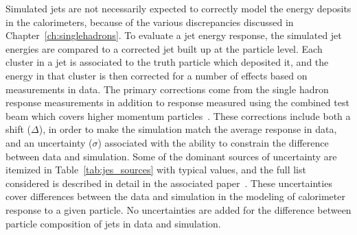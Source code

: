 Simulated jets are not necessarily expected to correctly model the energy deposits in the calorimeters, because of the various discrepancies discussed in Chapter~\ref{ch:singlehadrons}.
To evaluate a jet energy response, the simulated jet energies are compared to a corrected jet built up at the particle level.
Each cluster in a jet is associated to the truth particle which deposited it, and the energy in that cluster is then corrected for a number of effects based on measurements in data. 
The primary corrections come from the single hadron response measurements in addition to response measured using the combined test beam which covers higher momentum particles~\cite{CTB}.
These corrections include both a shift ($\Delta$), in order to make the simulation match the average response in data, and an uncertainty ($\sigma$) associated with the ability to constrain the difference between data and simulation.
Some of the dominant sources of uncertainty are itemized in Table~\ref{tab:jes_sources} with typical values, and the full list considered is described in detail in the associated paper~\cite{PERF-2015-05}. 
These uncertainties cover differences between the data and simulation in the modeling of calorimeter response to a given particle.
No uncertainties are added for the difference between particle composition of jets in data and simulation.


